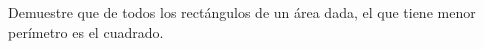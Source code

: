 \item Demuestre que de todos los rectángulos de un área dada, el que tiene menor perímetro es el cuadrado.
